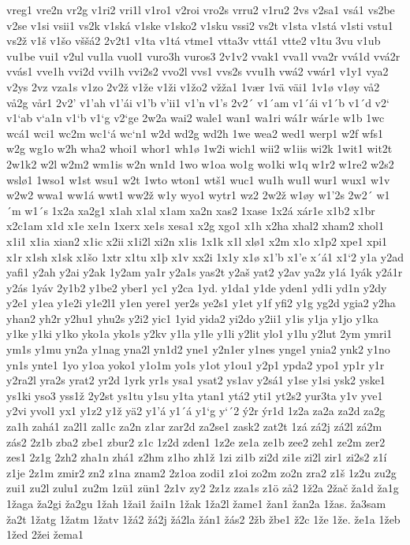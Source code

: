 vreg1
vre2n
vr2g
v1ri2
vri1l
v1ro1
v2roi
vro2s
vrru2
v1ru2
2vs
v2sa1
vsá1
vs2be
v2se
v1si
vsii1
vs2k
v1ská
v1ske
v1sko2
v1sku
vssi2
vs2t
v1sta
v1stá
v1sti
vstu1
vs2ž
v1š
v1šo
vššá2
2v2t1
v1ta
v1tá
vtme1
vtta3v
vttá1
vtte2
v1tu
3vu
v1ub
vu1be
vui1
v2ul
vu1la
vuol1
vuro3h
vuros3
2v1v2
vvak1
vva1l
vva2r
vvá1d
vvá2r
vvás1
vve1h
vvi2d
vvi1h
vvi2s2
vvo2l
vvs1
vvs2s
vvu1h
vwá2
vwár1
v1y1
vya2
v2ys
2vz
vza1s
v1zo
2v2ž
v1že
v1ži
v1žo2
vžža1
1vær
1vä
väi1
1v1ø
v1øy
vå2
vå2g
vår1
2v2'
v1'ah
v1'ái
v1'b
v'ii1
v1'n
v1's
2v2´
v1´am
v1´ái
v1´b
v1´d
v2`
v1`ab
v`a1n
v1`b
v1`g
v2`ge
2w2a
wai2
wale1
wan1
wa1ri
wá1r
wár1e
w1b
1wc
wcá1
wci1
wc2m
wc1`á
wc`n1
w2d
wd2g
wd2h
1we
wea2
wed1
werp1
w2f
wfs1
w2g
wg1o
w2h
wha2
whoi1
whor1
wh1ø
1w2i
wich1
wii2
w1iis
wi2k
1wit1
wit2t
2w1k2
w2l
w2m2
wm1is
w2n
wn1d
1wo
w1oa
wo1g
wo1ki
w1q
w1r2
w1re2
w2s2
wslø1
1wso1
w1st
wsu1
w2t
1wto
wton1
wtš1
wuc1
wu1h
wu1l
wur1
wux1
w1v
w2w2
wwa1
ww1á
wwt1
ww2ž
w1y
wyo1
wytr1
wz2
2w2ž
w1øy
w1'2s
2w2´
w1´m
w1´s
1x2a
xa2g1
x1ah
x1al
x1am
xa2n
xas2
1xase
1x2á
xár1e
x1b2
x1br
x2c1am
x1d
x1e
xe1n
1xerx
xe1s
xesa1
x2g
xgo1
x1h
x2ha
xhal2
xham2
xhol1
x1i1
x1ia
xian2
x1ic
x2ii
x1i2l
xi2n
x1is
1x1k
x1l
xlø1
x2m
x1o
x1p2
xpe1
xpi1
x1r
x1sh
x1sk
x1šo
1xtr
x1tu
x1þ
x1v
xx2i
1x1y
x1ø
x1'b
x1'e
x´á1
x1`2
y1a
y2ad
yafi1
y2ah
y2ai
y2ak
1y2am
ya1r
y2a1s
yas2t
y2aš
yat2
y2av
ya2z
y1á
1yák
y2á1r
y2ás
1yáv
2y1b2
y1be2
yber1
yc1
y2ca
1yd.
y1da1
y1de
yden1
yd1i
yd1n
y2dy
y2e1
y1ea
y1e2i
y1e2l1
y1en
yere1
yer2s
ye2s1
y1et
y1f
yfi2
y1g
yg2d
ygia2
y2ha
yhan2
yh2r
y2hu1
yhu2s
y2i2
yic1
1yid
yida2
yi2do
y2ii1
y1is
y1ja
y1jo
y1ka
y1ke
y1ki
y1ko
yko1a
yko1s
y2kv
y1la
y1le
y1li
y2lit
ylo1
y1lu
y2lut
2ym
ymri1
ym1s
y1mu
yn2a
y1nag
yna2l
yn1d2
yne1
y2n1er
y1nes
ynge1
ynia2
ynk2
y1no
yn1s
ynte1
1yo
y1oa
yoko1
y1o1m
yo1s
y1ot
y1ou1
y2p1
ypda2
ypo1
yp1r
y1r
y2ra2l
yra2s
yrat2
yr2d
1yrk
yr1s
ysa1
ysat2
ys1av
y2sá1
y1se
y1si
ysk2
yske1
ys1ki
yso3
yss1ž
2y2st
ys1tu
y1su
y1ta
ytan1
ytá2
yti1
yt2s2
yur3ta
y1v
yve1
y2vi
yvol1
yx1
y1z2
y1ž
yä2
y1'á
y1´á
y1`g
y`´2
ý2r
ýr1d
1z2a
za2a
za2d
za2g
za1h
zahá1
za2l1
zal1c
za2n
z1ar
zar2d
za2se1
zask2
zat2t
1zá
zá2j
zá2l
zá2m
zás2
2z1b
zba2
zbe1
zbur2
z1c
1z2d
zden1
1z2e
ze1a
ze1b
zee2
zeh1
ze2m
zer2
zes1
2z1g
2zh2
zha1n
zhá1
z2hm
z1ho
zh1ž
1zi
zi1b
zi2d
zi1e
zi2l
zir1
zi2s2
z1í
z1je
2z1m
zmir2
zn2
z1na
znam2
2z1oa
zodi1
z1oi
zo2m
zo2n
zra2
z1š
1z2u
zu2g
zui1
zu2l
zulu1
zu2m
1zü1
zün1
2z1v
zy2
2z1z
zza1s
z1ö
zå2
1ž2a
2žač
ža1d
ža1g
1žaga
ža2gi
ža2gu
1žah
1žai1
žai1n
1žak
1ža2l
žame1
žan1
žan2a
1žas.
ža3sam
ža2t
1žatg
1žatm
1žatv
1žá2
žá2j
žá2la
žán1
žás2
2žb
žbe1
ž2c
1že
1že.
že1a
1žeb
1žed
2žei
žema1
